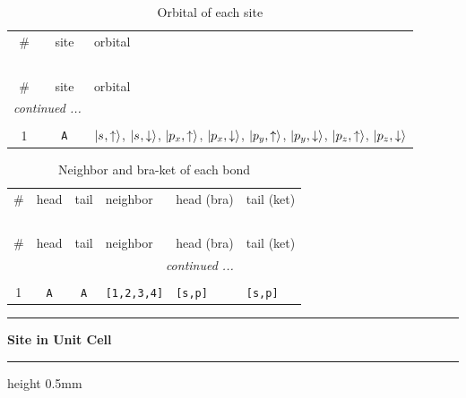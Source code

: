 \documentclass[fleqn,10pt,landscape]{jsarticle}
\begin{document}
\renewcommand{\arraystretch}{1.6}
\begin{longtable}[l]{ccl}
\captionsetup{justification=raggedright, singlelinecheck=off}
\caption{Orbital of each site}
 \\
 \hline \hline
\# & site & orbital \\ \hline \endfirsthead

\multicolumn{2}{l}{\tablename\ \thetable{}} \\
 \hline \hline
\# & site & orbital \\ \hline \endhead

 \hline \hline
\multicolumn{2}{r}{\footnotesize\it continued ...} \\ \endfoot

 \hline \hline
\multicolumn{2}{r}{} \\ \endlastfoot

1 & \texttt{A} & $\ket{s_{},\uparrow}$, $\ket{s_{},\downarrow}$, $\ket{p_{x},\uparrow}$, $\ket{p_{x},\downarrow}$, $\ket{p_{y},\uparrow}$, $\ket{p_{y},\downarrow}$, $\ket{p_{z},\uparrow}$, $\ket{p_{z},\downarrow}$ \\
\end{longtable}
\renewcommand{\arraystretch}{1.6}
\begin{longtable}[l]{ccclll}
\captionsetup{justification=raggedright, singlelinecheck=off}
\caption{Neighbor and bra-ket of each bond}
 \\
 \hline \hline
\# & head & tail & neighbor & head (bra) & tail (ket) \\ \hline \endfirsthead

\multicolumn{5}{l}{\tablename\ \thetable{}} \\
 \hline \hline
\# & head & tail & neighbor & head (bra) & tail (ket) \\ \hline \endhead

 \hline \hline
\multicolumn{5}{r}{\footnotesize\it continued ...} \\ \endfoot

 \hline \hline
\multicolumn{5}{r}{} \\ \endlastfoot

1 & \texttt{A} & \texttt{A} & \texttt{[1,2,3,4]} & \texttt{[s,p]} & \texttt{[s,p]} \\
\end{longtable}
\vspace{5mm}
\noindent \rule[0.5mm]{5mm}{0.5mm}\hspace{3mm}\textbf{Site in Unit Cell}\hspace{3mm}\leaders\hrule height 0.5mm\hfill\kern0pt
\vspace{3mm}
\end{document}
